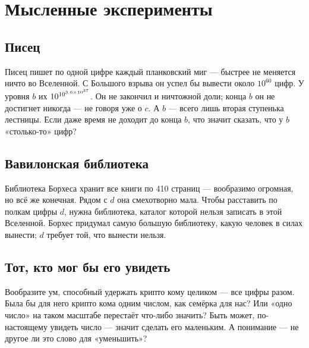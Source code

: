 \section{Мысленные эксперименты}

\subsection{Писец}
Писец пишет по одной цифре каждый планковский миг --- быстрее не меняется ничто во
Вселенной. С Большого взрыва он успел бы вывести около \(10^{60}\) цифр. У уровня \(b\) их
\(10^{10^{3.6\times10^{37}}}\). Он не закончил и ничтожной доли; конца \(b\) он не достигнет никогда --- не
говоря уже о \(c\). А \(b\) --- всего лишь вторая ступенька лестницы. Если даже время не
доходит до конца \(b\), что значит сказать, что у \(b\) «столько-то» цифр?

\subsection{Вавилонская библиотека}
Библиотека Борхеса хранит все книги по 410 страниц --- вообразимо огромная, но всё же
конечная. Рядом с \(d\) она смехотворно мала. Чтобы расставить по полкам цифры \(d\), нужна
библиотека, каталог которой нельзя записать в этой Вселенной. Борхес придумал самую большую
библиотеку, какую человек в силах вынести; \(d\) требует той, что вынести нельзя.

\subsection{Тот, кто мог бы его увидеть}
Вообразите ум, способный удержать крипто кому целиком --- все цифры разом. Была бы для него
крипто кома одним числом, как семёрка для нас? Или «одно число» на таком масштабе перестаёт
что-либо значить? Быть может, по-настоящему увидеть число --- значит сделать его маленьким.
А понимание --- не другое ли это слово для «уменьшить»?
